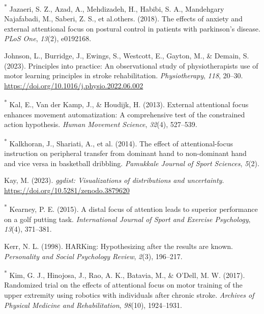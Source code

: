 \documentclass[
  man, donotrepeattitle,floatsintext]{apa7}
\newlength{\cslhangindent}
\newlength{\cslentryspacingunit} %
\newenvironment{CSLReferences}[2] %
 {%
  \setlength{\parindent}{0pt}
  \ifodd #1
  \let\oldpar\par
  \def\par{\hangindent=\cslhangindent\oldpar}
  \fi
  \setlength{\parskip}{#2\cslentryspacingunit}
 }%
 {}
\begin{document}
\begin{CSLReferences}{1}{0}
\leavevmode{}%
\textsuperscript{*} Jazaeri, S. Z., Azad, A., Mehdizadeh, H., Habibi, S. A., Mandehgary Najafabadi, M., Saberi, Z. S., et al.others. (2018). The effects of anxiety and external attentional focus on postural control in patients with parkinson's disease. \emph{PLoS One}, \emph{13}(2), e0192168.

\leavevmode{}%
Johnson, L., Burridge, J., Ewings, S., Westcott, E., Gayton, M., \& Demain, S. (2023). Principles into practice: {An} observational study of physiotherapists use of motor learning principles in stroke rehabilitation. \emph{Physiotherapy}, \emph{118}, 20--30. \url{https://doi.org/10.1016/j.physio.2022.06.002}

\leavevmode{}%
\textsuperscript{*} Kal, E., Van der Kamp, J., \& Houdijk, H. (2013). External attentional focus enhances movement automatization: A comprehensive test of the constrained action hypothesis. \emph{Human Movement Science}, \emph{32}(4), 527--539.

\leavevmode{}%
\textsuperscript{*} Kalkhoran, J., Shariati, A., et al. (2014). The effect of attentional-focus instruction on peripheral transfer from dominant hand to non-dominant hand and vice versa in basketball dribbling. \emph{Pamukkale Journal of Sport Sciences}, \emph{5}(2).

\leavevmode{}%
Kay, M. (2023). \emph{{ggdist}: Visualizations of distributions and uncertainty}. \url{https://doi.org/10.5281/zenodo.3879620}

\leavevmode{}%
\textsuperscript{*} Kearney, P. E. (2015). A distal focus of attention leads to superior performance on a golf putting task. \emph{International Journal of Sport and Exercise Psychology}, \emph{13}(4), 371--381.

\leavevmode{}%
Kerr, N. L. (1998). HARKing: Hypothesizing after the results are known. \emph{Personality and Social Psychology Review}, \emph{2}(3), 196--217.

\leavevmode{}%
\textsuperscript{*} Kim, G. J., Hinojosa, J., Rao, A. K., Batavia, M., \& O'Dell, M. W. (2017). Randomized trial on the effects of attentional focus on motor training of the upper extremity using robotics with individuals after chronic stroke. \emph{Archives of Physical Medicine and Rehabilitation}, \emph{98}(10), 1924--1931.


\end{CSLReferences}
\end{document}
